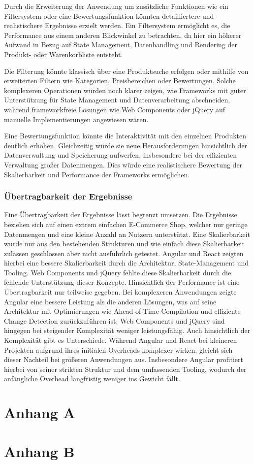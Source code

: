 \documentclass[oneside]{ausarbeitung}
\begin{document}
Durch die Erweiterung der Anwendung um zusätzliche Funktionen wie ein Filtersystem oder eine Bewertungsfunktion könnten detailliertere und realistischere Ergebnisse erzielt werden. Ein Filtersystem ermöglicht es, die Performance aus einem anderen Blickwinkel zu betrachten, da hier ein höherer Aufwand in Bezug auf State Management, Datenhandling und Rendering der Produkt- oder Warenkorbliste entsteht.

Die Filterung könnte klassisch über eine Produktsuche erfolgen oder mithilfe von erweiterten Filtern wie Kategorien, Preisbereichen oder Bewertungen. Solche komplexeren Operationen würden noch klarer zeigen, wie Frameworks mit guter Unterstützung für State Management und Datenverarbeitung abschneiden, während frameworkfreie Lösungen wie Web Components oder jQuery auf manuelle Implementierungen angewiesen wären.

Eine Bewertungsfunktion könnte die Interaktivität mit den einzelnen Produkten deutlich erhöhen. Gleichzeitig würde sie neue Herausforderungen hinsichtlich der Datenverwaltung und Speicherung aufwerfen, insbesondere bei der effizienten Verwaltung großer Datenmengen. Dies würde eine realistischere Bewertung der Skalierbarkeit und Performance der Frameworks ermöglichen.



\subsection{Übertragbarkeit der Ergebnisse}
\label{sub:uebertragbarkeit}

Eine Übertragbarkeit der Ergebnisse lässt begrenzt umsetzen. Die Ergebnisse beziehen sich auf einen extrem einfachen E-Commerce Shop, welcher nur geringe Datenmengen und eine kleine Anzahl an Nutzern unterstützt. Eine Skalierbarkeit wurde nur aus den bestehenden Strukturen und wie einfach diese Skalierbarkeit zulassen geschlossen aber nicht ausführlich getestet. 
Angular und React zeigten hierbei eine bessere Skalierbarkeit durch die Architektur, State-Management und Tooling. Web Components und jQuery fehlte diese Skalierbarkeit durch die fehlende Unterstützung dieser Konzepte. Hinsichtlich der Performance ist eine Übertragbarkeit nur teilweise gegeben. Bei komplexeren Anwendungen zeigte Angular eine bessere Leistung als die anderen Lösungen, was auf seine Architektur mit Optimierungen wie Ahead-of-Time Compilation und effiziente Change Detection zurückzuführen ist. Web Components und jQuery sind hingegen bei steigender Komplexität weniger leistungsfähig. 
Auch hinsichtlich der Komplexität gibt es Unterschiede. Während Angular und React bei kleineren Projekten aufgrund ihres initialen Overheads komplexer wirken, gleicht sich dieser Nachteil bei größeren Anwendungen aus. Insbesondere Angular profitiert hierbei von seiner strikten Struktur und dem umfassenden Tooling, wodurch der anfängliche Overhead langfristig weniger ins Gewicht fällt.

\appendix

\printbibliography

\chapter{Anhang A}

\chapter{Anhang B}
\end{document}
